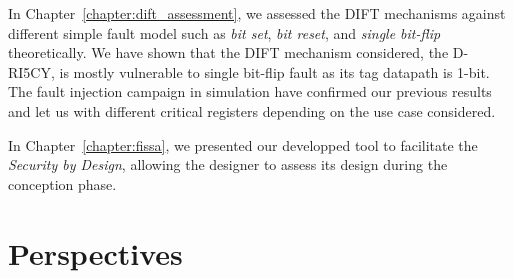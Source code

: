 In Chapter~\ref{chapter:dift_assessment}, we assessed the DIFT mechanisms against different simple fault model such as \textit{bit set}, \textit{bit reset}, and \textit{single bit-flip} theoretically. We have shown that the DIFT mechanism considered, the D-RI5CY, is mostly vulnerable to single bit-flip fault as its tag datapath is 1-bit. The fault injection campaign in simulation have confirmed our previous results and let us with different critical registers depending on the use case considered.

In Chapter~\ref{chapter:fissa}, we presented our developped tool to facilitate the \textit{Security by Design}, allowing the designer to assess its design during the conception phase.

\section{Perspectives}

